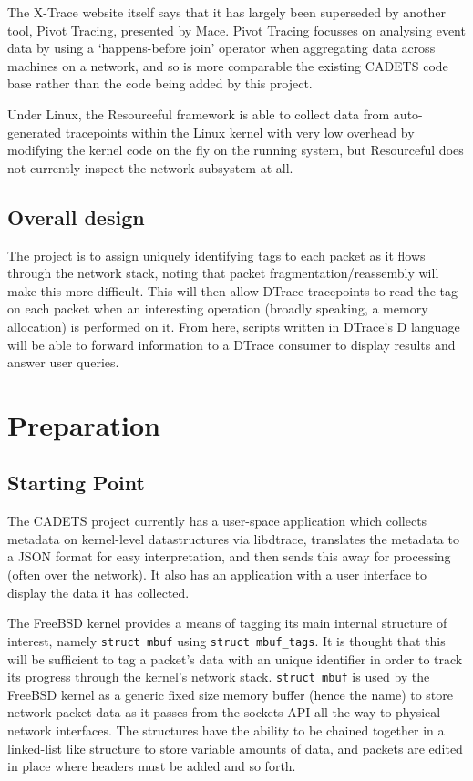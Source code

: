\documentclass[a4paper,12pt,twoside,openright]{report}
\begin{document}
	The X-Trace website itself says that it has largely been superseded by another tool, Pivot Tracing, presented by Mace\cite{Pivot-Tracing}. Pivot Tracing focusses on analysing event data by using a `happens-before join' operator when aggregating data across machines on a network, and so is more comparable the existing CADETS code base rather than the code being added by this project.
	
	Under Linux, the Resourceful\cite{Resourceful} framework is able to collect data from auto-generated tracepoints	within the Linux kernel with very low overhead by modifying the kernel code on the fly on the running system, but Resourceful does not currently inspect the network subsystem at all.
	
	\section{Overall design}
	
	The project is to assign uniquely identifying tags to each packet as it flows through the network stack, noting that packet fragmentation/reassembly will make this more difficult. This will then allow DTrace tracepoints to read the tag on each packet when an interesting operation (broadly speaking, a memory allocation) is performed on it. From here, scripts written in DTrace's D language will be able to forward information to a DTrace consumer to display results and answer user queries.

	
	
	\chapter{Preparation}
	
	\section{Starting Point}
	\label{sec:starting-point}
	
	The CADETS project currently has a user-space application which collects metadata on kernel-level	datastructures via libdtrace, translates the metadata to a JSON format for easy interpretation, and	then sends this away for processing (often over the network). It also has an application with a user interface to display the data it has collected.
	
	The FreeBSD kernel provides a means of tagging its main internal structure of interest, namely \verb|struct mbuf| using \verb|struct mbuf_tags|. It is thought that this will be sufficient to tag a packet’s data with an unique identifier in order to track its progress through the kernel’s network stack. \verb|struct mbuf| is used by the FreeBSD kernel as a generic fixed size memory buffer (hence the name) to store network packet data as it passes from the sockets API all the way to physical network interfaces. The structures have the ability to be chained together in a linked-list like structure to store variable amounts of data, and packets are edited in place where headers must be added and so forth.
	
\end{document}
